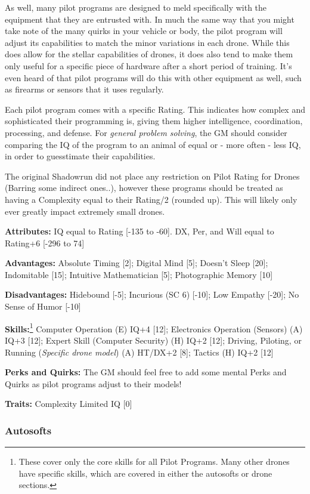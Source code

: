 As well, many pilot programs are designed to meld specifically with the equipment that they are entrusted with. In much the same way that you might take note of the many quirks in your vehicle or body, the pilot program will adjust its capabilities to match the minor variations in each drone. While this does allow for the stellar capabilities of drones, it does also tend to make them only useful for a specific piece of hardware after a short period of training. It's even heard of that pilot programs will do this with other equipment as well, such as firearms or sensors that it uses regularly.

Each pilot program comes with a specific Rating. This indicates how complex and sophisticated their programming is, giving them higher intelligence, coordination, processing, and defense. For \textit{general problem solving}, the GM should consider comparing the IQ of the program to an animal of equal or - more often - less IQ, in order to guesstimate their capabilities.

The original Shadowrun did not place any restriction on Pilot Rating for Drones (Barring some indirect ones..), however these programs should be treated as having a Complexity equal to their Rating/2 (rounded up). This will likely only ever greatly impact extremely small drones.

\textbf{Attributes:} 
IQ equal to Rating [-135 to -60]. DX, Per, and Will equal to Rating+6 [-296 to 74]

\textbf{Advantages:} 
Absolute Timing [2]; Digital Mind [5]; Doesn't Sleep [20]; Indomitable [15]; Intuitive Mathematician [5]; Photographic Memory [10]

\textbf{Disadvantages:} 
Hidebound [-5]; Incurious (SC 6) [-10]; Low Empathy [-20]; No Sense of Humor [-10]

\textbf{Skills:}\footnote{These cover only the core skills for all Pilot Programs. Many other drones have specific skills, which are covered in either the autosofts or drone sections.}
Computer Operation (E) IQ+4 [12]; Electronics Operation (Sensors) (A) IQ+3 [12]; Expert Skill (Computer Security) (H) IQ+2 [12]; Driving, Piloting, or Running (\textit{Specific drone model}) (A) HT/DX+2 [8]; Tactics (H) IQ+2 [12]

\textbf{Perks and Quirks:}
The GM should feel free to add some mental Perks and Quirks as pilot programs adjust to their models!

\textbf{Traits:}
Complexity Limited IQ [0]

\subsubsection{Autosofts}\label{autosofts}

